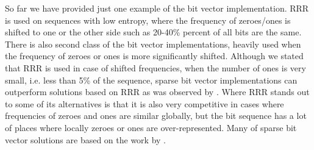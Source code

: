 So far we have provided just one example of the bit vector implementation.
RRR is used on sequences with low entropy, where the frequency of zeroes/ones
is shifted to one or the other side such as 20-40\% percent of all bits are the same.
There is also second class of the bit vector implementations, heavily
used when the frequency of zeroes or ones is more significantly shifted.
Although we stated that RRR is used in case of shifted frequencies, when the number
of ones is very small, i.e. less than 5\% of the sequence, sparse bit vector
implementations can outperform solutions based on RRR as was observed by \cite{navarro2012fast}.
Where RRR stands out to some of its alternatives is that it is also very competitive
in cases where frequencies of zeroes and ones are similar globally, but the bit
sequence has a lot of places where locally zeroes or ones are over-represented.
Many of sparse bit vector solutions are based on the work by \cite{okanohara2007practical}.
